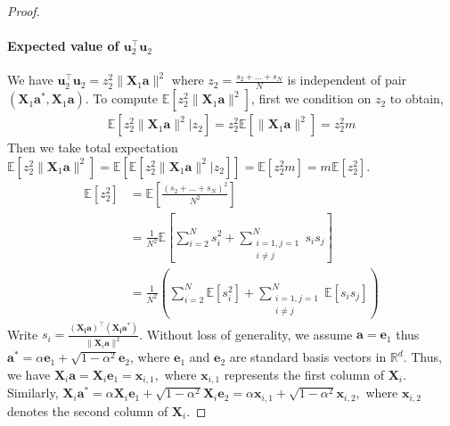 \documentclass{article}
\theoremstyle{plain}
\theoremstyle{definition}
\theoremstyle{remark}
\begin{document}
\begin{proof}
    \paragraph{Expected value of $\mathbf{u}_2^\top \mathbf{u}_2$} We have $\mathbf{u}_2^\top \mathbf{u}_2=z_2^2 \| \mathbf{X}_1 \mathbf{a}\|^2$ where $z_2 = \frac{s_2 + \dots +s_N}{N}$ is independent of pair $(\mathbf{X}_1 \mathbf{a}^*, \mathbf{X}_1 \mathbf{a})$. To compute $\mathbb{E} \left[ z_2^2 \| \mathbf{X}_1 \mathbf{a}\|^2 \right]$, first we condition on $z_2$ to obtain,  
    \begin{align}
        \mathbb{E} \left[ z_2^2 \| \mathbf{X}_1 \mathbf{a}\|^2 | z_2 \right] =  z_2^2  \mathbb{E} \left[  \| \mathbf{X}_1 \mathbf{a}\|^2\right] =z^2_2 m
    \end{align}
    Then we take total expectation $ \mathbb{E} \left[ z_2^2 \| \mathbf{X}_1 \mathbf{a}\|^2 \right] = \mathbb{E} \left[ \mathbb{E} \left[ z_2^2 \| \mathbf{X}_1 \mathbf{a}\|^2 | z_2 \right] \right] = \mathbb{E} \left[z_2^2 m \right] = m \mathbb{E} \left[z_2^2 \right] $. 
    \begin{align}
        \mathbb{E} \left[z_2^2 \right] & = \mathbb{E} \left[ \frac{(s_2+\dots +s_N)^2}{N^2} \right] \\
        & = \frac{1}{N^2} \mathbb{E} \left[ \sum_{i=2}^{N} s_i^2 + \sum_{\substack{i=1, j=1\\ i\neq j}}^{N} s_i s_j\right] \\
        & = \frac{1}{N^2}  \left(\sum_{i=2}^{N} \mathbb{E} \left[s_i^2 \right]+ \sum_{\substack{i=1, j=1\\ i\neq j}}^{N}  \mathbb{E} \left[ s_i s_j \right]\right)
    \end{align}
    Write $s_i = \frac{(\mathbf{X_i}\mathbf{a})^\top(\mathbf{X_i}\mathbf{a}^*)}{\lVert \mathbf{X}_i \mathbf{a} \rVert^2}$. Without loss of generality, we assume $\mathbf{a}=\mathbf{e}_1$ thus $\mathbf{a}^*=\alpha \mathbf{e}_1+\sqrt{1-\alpha^2}\mathbf{e}_2$, where $\mathbf{e}_1$ and $\mathbf{e}_2$ are standard basis vectors in $\mathbb{R}^d$. 
    Thus, we have 
$
\mathbf{X}_i\mathbf{a} = \mathbf{X}_i\mathbf{e}_1 = \mathbf{x}_{i,1},
$
where \(\mathbf{x}_{i,1}\) represents the first column of \(\mathbf{X}_i\). Similarly, 
$
\mathbf{X}_i\mathbf{a}^* = \alpha \mathbf{X}_i\mathbf{e}_1 + \sqrt{1-\alpha^2}\mathbf{X}_i\mathbf{e}_2 = \alpha \mathbf{x}_{i,1} + \sqrt{1-\alpha^2} \mathbf{x}_{i,2},
$
where \(\mathbf{x}_{i,2}\) denotes the second column of \(\mathbf{X}_i\).


\end{proof}
\end{document}
